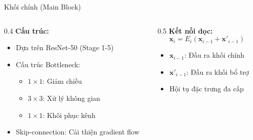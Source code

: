 \begin{frame}{Khối chính (Main Block)}
    \begin{columns}
        \begin{column}{0.4\textwidth}
            \textbf{Cấu trúc:}
            \begin{itemize}
                \item Dựa trên ResNet-50 (Stage 1-5)
                \item Cấu trúc Bottleneck:
                \begin{itemize}
                    \item $1 \times 1$: Giảm chiều
                    \item $3 \times 3$: Xử lý không gian
                    \item $1 \times 1$: Khôi phục kênh
                \end{itemize}
                \item Skip-connection: Cải thiện gradient flow
            \end{itemize}
        \end{column}
        \begin{column}{0.5\textwidth}
            \textbf{Kết nối dọc:}
            \begin{equation}
                \mathbf{x}_i = E_i(\mathbf{x}_{i-1} + \mathbf{x}'_{i-1})
            \end{equation}
            \begin{itemize}
                \item $\mathbf{x}_{i-1}$: Đầu ra khối chính
                \item $\mathbf{x}'_{i-1}$: Đầu ra khối bổ trợ
                \item Hội tụ đặc trưng đa cấp
            \end{itemize}
        \end{column}
    \end{columns}
\end{frame}

